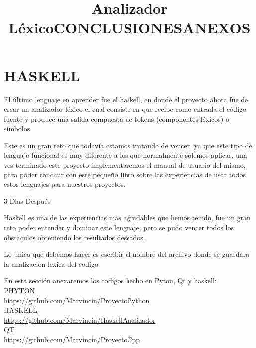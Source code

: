 \documentclass[12pt]{extbook}
\begin{document}
\chapter{HASKELL}
\begin{center}
\title{\Large{Analizador Léxico}}\maketitle
\end{center}
El último lenguaje en aprender fue el haskell, en donde el proyecto ahora fue de crear un analizador léxico el cual consiste en que recibe como entrada el código fuente  y produce una salida compuesta de tokens (componentes léxicos) o símbolos.




\begin{center}
\title{CONCLUSIONES}\maketitle
\end{center}

Este es un gran reto que todavía estamos tratando de vencer, ya que
este tipo de lenguaje funcional es muy diferente a los que normalmente
solemos aplicar, una ves terminado este proyecto implementaremos el
manual de usuario del mismo, para poder concluir con este pequeño
libro sobre las experiencias de usar todos estos lenguajes para nuestros
proyectos.\\
\begin{center}
{\Large{3 Dias Después}}\\
\end{center}
Haskell es una de las experiencias mas agradables que hemos tenido, fue un 
gran reto poder entender y dominar este lenguaje, pero se pudo vencer
todos los obstaculos obteniendo los resultados deseados.

Lo unico que debemos hacer es escribir el nombre del archivo donde se guardara la analizacion lexica del codigo


\newpage
\begin{center}
\title{ANEXOS}\maketitle
\end{center}
En esta sección anexaremos los codigos hecho en Pyton, Qt y haskell:\\
PHYTON\\
\href{https://github.com/Marvincin/ProyectoPython}{https://github.com/Marvincin/ProyectoPython}\\
HASKELL\\
\href{https://github.com/Marvincin/Haskell_Analizador}{https://github.com/Marvincin/HaskellAnalizador}\\
QT\\
\href{https://github.com/Marvincin/ProyectoCpp}{https://github.com/Marvincin/ProyectoCpp}\\
\end{document}
